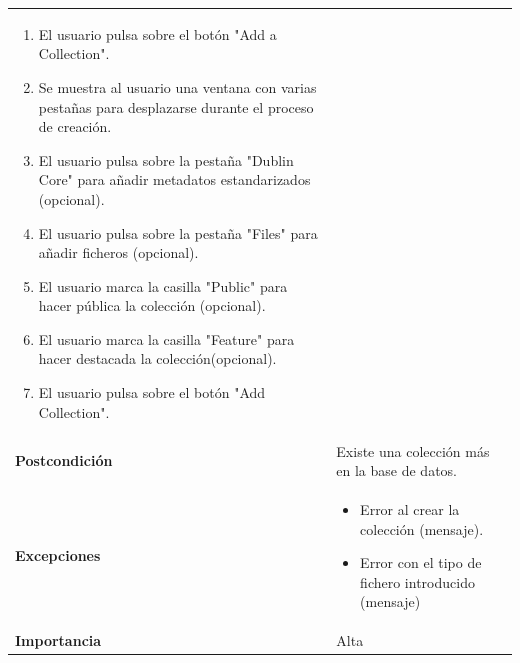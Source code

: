 \documentclass[
]{article}
\providecommand{\tightlist}{%
  \setlength{\itemsep}{0pt}\setlength{\parskip}{0pt}}
\begin{document}
\begin{longtable}[]{@{}ll@{}}
\begin{minipage}[t]{0.76\columnwidth}
\begin{enumerate}
\tightlist
\item
  El usuario pulsa sobre el botón "Add a Collection".
\item
  Se muestra al usuario una ventana con varias pestañas para desplazarse
  durante el proceso de creación.
\item
  El usuario pulsa sobre la pestaña "Dublin Core" para añadir metadatos
  estandarizados (opcional).
\item
  El usuario pulsa sobre la pestaña "Files" para añadir ficheros
  (opcional).
\item
  El usuario marca la casilla "Public" para hacer pública la colección
  (opcional).
\item
  El usuario marca la casilla "Feature" para hacer destacada la
  colección(opcional).
\item
  El usuario pulsa sobre el botón "Add Collection".
\end{enumerate}\strut
\end{minipage}\tabularnewline
\begin{minipage}[t]{0.18\columnwidth}\raggedright
\textbf{Postcondición}\strut
\end{minipage} & \begin{minipage}[t]{0.76\columnwidth}\raggedright
Existe una colección más en la base de datos.\strut
\end{minipage}\tabularnewline
\begin{minipage}[t]{0.18\columnwidth}\raggedright
\textbf{Excepciones}\strut
\end{minipage} & \begin{minipage}[t]{0.76\columnwidth}\raggedright
\begin{itemize}
\tightlist
\item
  Error al crear la colección (mensaje).
\item
  Error con el tipo de fichero introducido (mensaje)
\end{itemize}\strut
\end{minipage}\tabularnewline
\begin{minipage}[t]{0.18\columnwidth}\raggedright
\textbf{Importancia}\strut
\end{minipage} & \begin{minipage}[t]{0.76\columnwidth}\raggedright
Alta\strut
\end{minipage}\tabularnewline
\bottomrule
\end{longtable}
\end{document}
